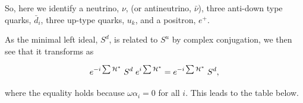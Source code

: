 \documentclass[letterpaper,12pt,titlepage,oneside,final]{book}
\begin{document}
\noindent So, here we identify a neutrino, $\nu$, (or antineutrino, $\bar{\nu}$), three anti-down type quarks, $\bar{d}_i$, three up-type quarks, $u_k$, and a positron, $e^+$.



As the minimal left ideal, $S^d$, is related to $S^u$ by complex conjugation, we then see that it transforms as 

\begin{equation}\label{transfspin}
e^{-i\sum\mathcal{H}^*} \hspace{1mm}S^d \hspace{1mm}e^{i\sum\mathcal{H}^*} =e^{-i\sum\mathcal{H}^*} \hspace{1mm}S^d  ,
\end{equation}

\noindent where the equality holds because $\omega \alpha_i =0$ for all $i$.  This leads to the table below.  
\end{document}
